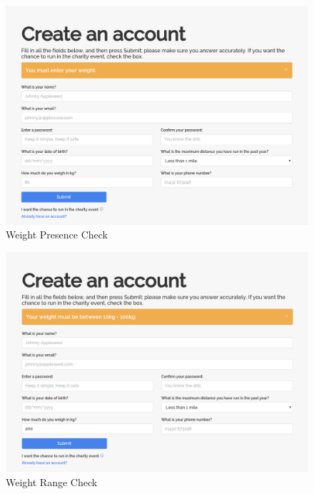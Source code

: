 \documentclass{article}[12pt,a4paper]
\begin{document}
\begin{figure}[h!]
  \includegraphics[scale=0.25]{images/testing/registration_validation/weight_presence}
  \caption{Weight Presence Check}
\end{figure}

\begin{figure}[h!]
  \includegraphics[scale=0.25]{images/testing/registration_validation/weight_range}
  \caption{Weight Range Check}
\end{figure}
\end{document}
